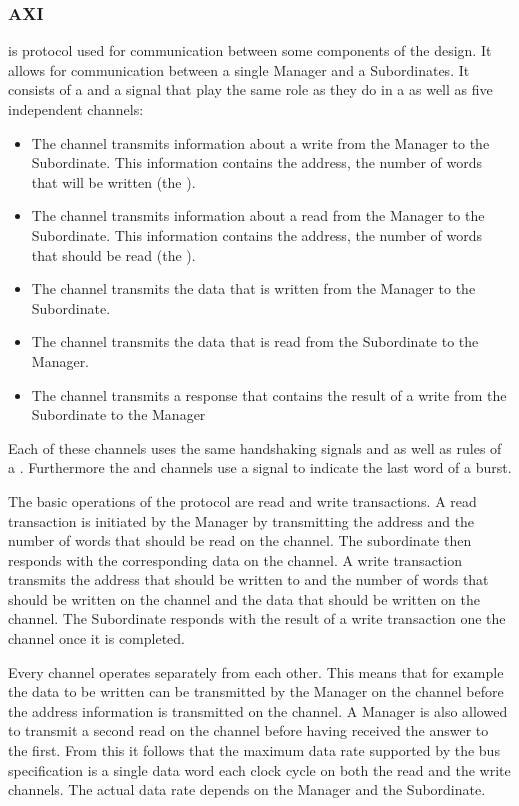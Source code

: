 \subsubsection{AXI}\label{sec:AXI}
\AXI{}\autocite{ref:axi} is protocol used for communication between some components of the \FPGA{} design. It allows for communication between a single Manager and a Subordinates. It consists of a \ACLK{} and a \ARESETn{} signal that play the same role as they do in a \AXIStream{} as well as five independent channels:
\begin{itemize}
  \item The \AW{} channel transmits information about a write from the Manager to the Subordinate. This information contains the address, the number of words that will be written (the \burstsize{}).
  \item The \AR{} channel transmits information about a read from the Manager to the Subordinate. This information contains the address, the number of words that should be read (the \burstsize{}).
  \item The \W{} channel transmits the data that is written from the Manager to the Subordinate.
  \item The \R{} channel transmits the data that is read from the Subordinate to the Manager.
  \item The \B{} channel transmits a response that contains the result of a write from the Subordinate to the Manager
\end{itemize}
Each of these channels uses the same handshaking signals \READY{} and \VALID{} as well as rules of a \AXIStream{}. Furthermore the \W{} and \R{} channels use a \LAST{} signal to indicate the last word of a burst.

The basic operations of the \AXI{} protocol are read and write transactions. A read transaction is initiated by the Manager by transmitting the address and the number of words that should be read on the \AR{} channel. The subordinate then responds with the corresponding data on the \R{} channel. A write transaction transmits the address that should be written to and the number of words that should be written on the \AW{} channel  and the data that should be written on the \W{} channel. The Subordinate responds with the result of a write transaction one the \B{} channel once it is completed.

Every channel operates separately from each other. This means that for example the data to be written can be transmitted by the Manager on the \W{} channel before the address information is transmitted on the \AW{} channel. A Manager is also allowed to transmit a second read on the \AR{} channel before having received the answer to the first.
From this it follows that the maximum data rate supported by the bus specification is a single data word each clock cycle on both the read and the write channels. The actual data rate depends on the Manager and the Subordinate.



